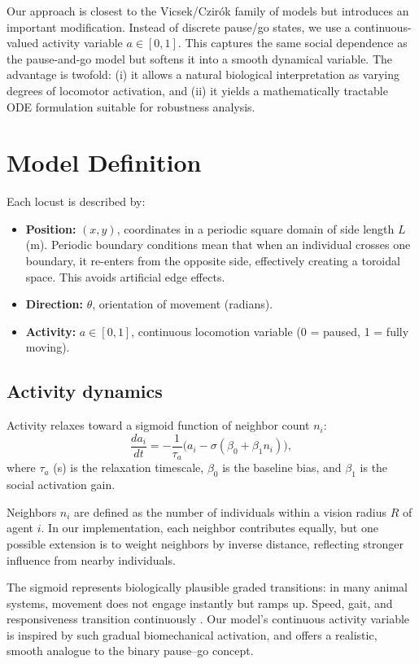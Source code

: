 \documentclass[11pt,a4paper]{article}
\begin{document}
Our approach is closest to the Vicsek/Czirók family of models but introduces an important modification. Instead of discrete pause/go states, we use a continuous-valued activity variable $a \in [0,1]$. This captures the same social dependence as the pause-and-go model but softens it into a smooth dynamical variable. The advantage is twofold: (i) it allows a natural biological interpretation as varying degrees of locomotor activation, and (ii) it yields a mathematically tractable ODE formulation suitable for robustness analysis.

\section{Model Definition}

Each locust is described by:
\begin{itemize}
    \item \textbf{Position:} $(x,y)$, coordinates in a periodic square domain of side length $L$ (m). Periodic boundary conditions mean that when an individual crosses one boundary, it re-enters from the opposite side, effectively creating a toroidal space. This avoids artificial edge effects.
    \item \textbf{Direction:} $\theta$, orientation of movement (radians).
    \item \textbf{Activity:} $a \in [0,1]$, continuous locomotion variable (0 = paused, 1 = fully moving).
\end{itemize}

\subsection{Activity dynamics}
Activity relaxes toward a sigmoid function of neighbor count $n_i$:
\begin{equation}
\frac{da_i}{dt} = -\frac{1}{\tau_a}\Big(a_i - \sigma(\beta_0 + \beta_1 n_i)\Big),
\label{eq:activity}
\end{equation}
where $\tau_a$ (s) is the relaxation timescale, $\beta_0$ is the baseline bias, and $\beta_1$ is the social activation gain.  

Neighbors $n_i$ are defined as the number of individuals within a vision radius $R$ of agent $i$. In our implementation, each neighbor contributes equally, but one possible extension is to weight neighbors by inverse distance, reflecting stronger influence from nearby individuals.

The sigmoid represents biologically plausible graded transitions: in many animal systems, movement does not engage instantly but ramps up. Speed, gait, and responsiveness transition continuously \cite{fukuchi2019gait}. Our model's continuous activity variable is inspired by such gradual biomechanical activation, and offers a realistic, smooth analogue to the binary pause--go concept.
\end{document}
